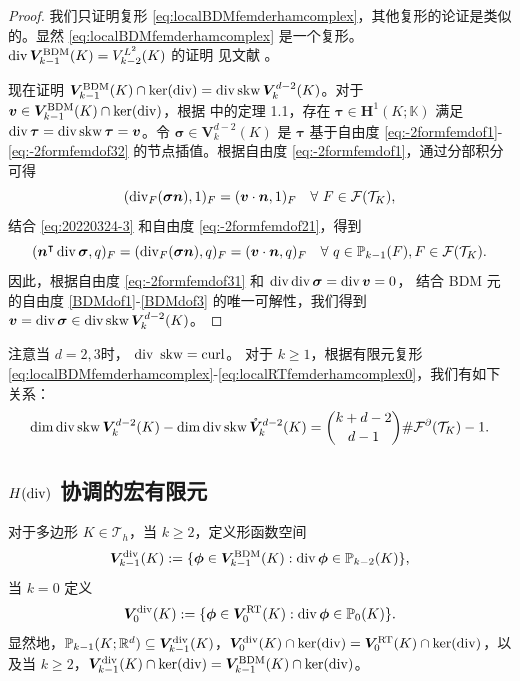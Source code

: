 \begin{proof}
我们只证明复形
\eqref{eq:localBDMfemderhamcomplex}，其他复形的论证是类似的。显然
\eqref{eq:localBDMfemderhamcomplex} 是一个复形。
$\operatorname{div}\boldsymbol{V}_{k-1}^{\mathrm{BDM}}(K)=V_{k-2}^{L^2}(K)$ 的证明
见文献 \cite[第4节]{ChenHuang2021divX}。 

现在证明
$\boldsymbol{V}_{k-1}^{\mathrm{BDM}}(K)\cap\ker(\operatorname{div})=\operatorname{div}\operatorname{skw}\boldsymbol{V}_{k}^{d-2}(K)$。对于
$\boldsymbol{v}\in\boldsymbol{V}_{k-1}^{\mathrm{BDM}}(K)\cap\ker(\operatorname{div})$，根据
\cite{CostabelMcIntosh2010} 中的定理 1.1，存在
$\boldsymbol{\tau}\in\boldsymbol{H}^1(K;\mathbb K)$ 满足
$\operatorname{div}\boldsymbol{\tau}=\operatorname{div}\operatorname{skw}\boldsymbol{\tau}=\boldsymbol{v}$。令
$\boldsymbol{\sigma}\in \boldsymbol{V}_{k}^{d-2}(K)$ 是 $\boldsymbol{\tau}$
基于自由度 \eqref{eq:-2formfemdof1}-\eqref{eq:-2formfemdof32}
的节点插值。根据自由度 \eqref{eq:-2formfemdof1}，通过分部积分可得
\[
(\operatorname{div}_F(\boldsymbol{\sigma}\boldsymbol{n}), 1)_F=(\boldsymbol{v}\cdot\boldsymbol{n}, 1)_F\quad\forall~F\in\mathcal F(\mathcal T_K),
\]
结合 \eqref{eq:20220324-3} 和自由度 \eqref{eq:-2formfemdof21}，得到
\[
(\boldsymbol{n}^{\intercal}\operatorname{div}\boldsymbol{\sigma}, q)_F = (\operatorname{div}_F(\boldsymbol{\sigma}\boldsymbol{n}), q)_F=(\boldsymbol{v}\cdot\boldsymbol{n}, q)_F\quad\forall~q\in \mathbb P_{k-1}(F),F\in\mathcal F(\mathcal T_K).
\]
因此，根据自由度 \eqref{eq:-2formfemdof31} 和
$\operatorname{div}\operatorname{div}\boldsymbol{\sigma}=\operatorname{div}\boldsymbol{v}=0$，
结合 BDM 元的自由度 \eqref{BDMdof1}-\eqref{BDMdof3} 的唯一可解性，我们得到 $\boldsymbol{v}=\operatorname{div}\boldsymbol{\sigma} \in \operatorname{div}\operatorname{skw}\boldsymbol{V}_{k}^{d-2}(K)$。
\end{proof}
注意当 $d=2, 3$时， $\operatorname{div}\ \mathrm{skw}=\mathrm{curl}$。
对于 $k\geq1$，根据有限元复形 \eqref{eq:localBDMfemderhamcomplex}-\eqref{eq:localRTfemderhamcomplex0}，我们有如下关系：
\begin{equation}\label{eq:20220324-4}
\mathrm{dim}\operatorname{div}\operatorname{skw}\boldsymbol{V}_{k}^{d-2}(K)-\mathrm{dim}\operatorname{div}\operatorname{skw} 
\mathring{\boldsymbol{V}}_{k}^{d-2}(K)={k+d-2\choose d-1}\#\mathcal F^{\partial}(\mathcal T_K)-1.
\end{equation}

\subsection{$H(\operatorname{div})$ 协调的宏有限元}

对于多边形 $K\in \mathcal T_h$，当 $k\geq2$，定义形函数空间
\[
\boldsymbol{V}_{k-1}^{\rm div}(K):=\{\boldsymbol{\phi}\in\boldsymbol{V}_{k-1}^{\mathrm{BDM}}(K): \operatorname{div}\boldsymbol{\phi}\in\mathbb P_{k-2}(K)\},
\]
当 $k=0$ 定义
\[
\boldsymbol{V}_{0}^{\rm div}(K):=\{\boldsymbol{\phi}\in\boldsymbol{V}_{0}^{\mathrm{RT}}(K): \operatorname{div}\boldsymbol{\phi}\in\mathbb P_{0}(K)\}.
\]
显然地，$\mathbb P_{k-1}(K;\mathbb R^d)\subseteq\boldsymbol{V}_{k-1}^{\rm
div}(K)$，$\boldsymbol{V}_{0}^{\rm
div}(K)\cap\ker(\operatorname{div})=\boldsymbol{V}_0^{\mathrm{RT}}(K)\cap\ker(\operatorname{div})$，以及当
$k\geq2$，$\boldsymbol{V}_{k-1}^{\rm
div}(K)\cap\ker(\operatorname{div})=\boldsymbol{V}_{k-1}^{\mathrm{BDM}}(K)\cap\ker(\operatorname{div})$。

